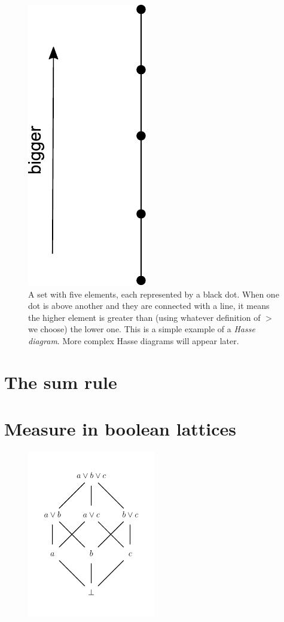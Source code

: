 \documentclass[a4paper, 12pt]{article}
\begin{document}
\begin{figure}[!ht]
\centering
\includegraphics[scale=0.6]{figures/totally_ordered_set.pdf}
\caption{A set with five elements, each represented by a black dot.
When one dot is above another and they are connected with a line, it
means the higher element is greater than (using whatever definition of $>$ we
choose) the lower one.
This is a simple example of a {\em Hasse diagram}. More complex
Hasse diagrams will appear later.\label{fig:totally_ordered_set}}
\end{figure}


\section{The sum rule}

\section{Measure in boolean lattices}


\begin{figure}[!ht]
\centering
\includegraphics[width=0.5\textwidth]{figures/boolean_lattice.pdf}
\caption{\label{fig:boolean_lattice}}
\end{figure}
\end{document}
